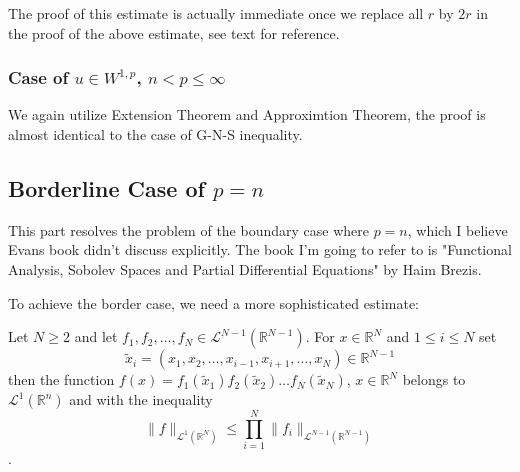 \documentclass{article}
\begin{document}
The proof of this estimate is actually immediate once we replace all $r$ by $2r$ in the proof of the above estimate, see text for reference.

\subsubsection{Case of $u\in W^{1, p}$, $n< p\leq \infty$}

\indent\indent We again utilize Extension Theorem and Approximtion Theorem, the proof is almost identical to the case of G-N-S inequality.

\subsection{Borderline Case of $p=n$}

\indent\indent This part resolves the problem of the boundary case where $p=n$, which I believe Evans book didn't discuss explicitly. The book I'm going to refer to is "Functional Analysis, Sobolev Spaces and Partial Differential Equations" by Haim Brezis.

To achieve the border case, we need a more sophisticated estimate:

\begin{Lem}
    Let $N\geq 2$ and let $f_1, f_2, \dots, f_N\in\mathscr{L}^{N-1}(\mathbb{R}^{N-1})$. For $x\in\mathbb{R}^N$ and $1\leq i\leq N$ set
    $$
    \tilde{x}_{i} = (x_1, x_2, \dots, x_{i-1}, x_{i+1}, \dots, x_N)\in\mathbb{R}^{N-1}
    $$
    then the function $f(x)=f_{1}(\tilde{x}_1)f_2(\tilde{x}_2)\dots f_N(\tilde{x}_N)$, $x\in\mathbb{R}^N$ belongs to $\mathscr{L}^1(\mathbb{R}^n)$ and with the inequality 
    $$    \|f\|_{\mathscr{L}^1(\mathbb{R}^N)}\leq\prod_{i=1}^N\|f_i\|_{\mathscr{L}^{N-1}(\mathbb{R}^{N-1})}
    $$.
\end{Lem}
\end{document}
